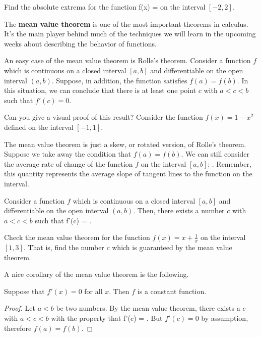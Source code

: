 \documentclass[11pt]{amsart}
\begin{document}
\begin{eg} Find the absolute extrema for the function 
\beqn
f(x) =  
\eeqn
on the interval $[-2,2]$. 
\end{eg} 

\vspace{5cm} 

The {\bf mean value theorem} is one of the most important theorems in calculus. 
It's the main player behind much of the techniques we will learn in the upcoming weeks about describing the behavior of functions. 

An easy case of the mean value theorem is Rolle's theorem. 
Consider a function $f$ which is continuous on a closed interval $[a,b]$ and differentiable on the open interval $(a,b)$.
Suppose, in addition, the function satisfies $f(a) = f(b)$. 
In this situation, we can conclude that there is at least one point $c$ with $a < c < b$ such that $f'(c) = 0$. 

\begin{eg}
Can you give a visual proof of this result? 
Consider the function $f(x) = 1 - x^2$ defined on the interval $[-1,1]$. 
\end{eg} 


The mean value theorem is just a skew, or rotated version, of Rolle's theorem. 
Suppose we take away the condition that $f(a) = f(b)$. 
We can still consider the average rate of change of the function $f$ on the interval $[a,b]$:
\beqn
{} .
\eeqn
Remember, this quantity represents the average slope of tangent lines to the function on the interval. 

\begin{thm}
Consider a function $f$ which is continuous on a closed interval $[a,b]$ and differentiable on the open interval $(a,b)$.
Then, there exists a number $c$ with $a < c < b$ such that
\beqn
f'(c) =  .
\eeqn
\end{thm}


\begin{eg} 
Check the mean value theorem for the function $f(x) = x + \frac{1}{x}$ on the interval $[1,3]$. 
That is, find the number $c$ which is guaranteed by the mean value theorem. 
\end{eg}

\vspace{5cm} 

A nice corollary of the mean value theorem is the following. 

\begin{cor} 
Suppose that $f'(x) = 0$ for all $x$. 
Then $f$ is a constant function. 
\end{cor} 
\begin{proof} 
Let $a < b$ be two numbers. 
By the mean value theorem, there exists a $c$ with $a < c < b$ with the property that
\beqn
f'(c) =  .
\eeqn
But $f'(c) = 0$ by assumption, therefore $f(a) = f(b)$. 
\end{proof}
\end{document}
